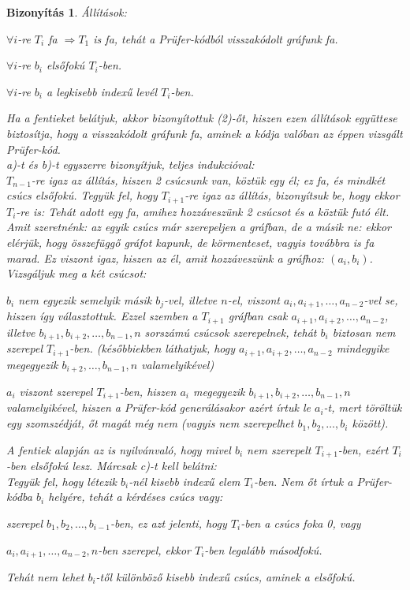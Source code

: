 \documentclass[a4paper,12pt,twoside]{book}
\newtheorem{biz}{Bizonyítás}[chapter]
\theoremstyle{break}
\begin{document}
\begin{biz}
\textit{Állítások}:
\begin{enumerate*}
 \renewcommand{\labelenumi}{\alph{enumi})}
 \item $\forall i$-re $T_i$ fa $\Rightarrow T_1$  is fa, tehát a Prüfer-kódból visszakódolt gráfunk fa.
 \item $\forall i$-re $b_i$ elsőfokú $T_i$-ben.
 \item $\forall i$-re $b_i$ a legkisebb indexű levél $T_i$-ben.
\end{enumerate*}
Ha a fentieket belátjuk, akkor bizonyítottuk (2)-őt, hiszen ezen állítások együttese biztosítja, hogy a visszakódolt gráfunk fa, aminek a kódja valóban az éppen vizsgált Prüfer-kód.\\
a)-t és b)-t egyszerre bizonyítjuk, teljes indukcióval:\\
$T_{n-1}$-re igaz az állítás, hiszen 2 csúcsunk van, köztük egy él; ez fa, és mindkét csúcs elsőfokú. Tegyük fel, hogy $T_{i+1}$-re igaz az állítás, bizonyítsuk be, hogy ekkor $T_i$-re is: Tehát adott egy fa, amihez hozzáveszünk 2 csúcsot és a köztük futó élt. Amit szeretnénk: az egyik csúcs már szerepeljen a gráfban, de a másik ne: ekkor elérjük, hogy összefüggő gráfot kapunk, de körmenteset, vagyis továbbra is fa marad. Ez viszont igaz, hiszen az él, amit hozzáveszünk a gráfhoz: $(a_i, b_i)$. Vizsgáljuk meg a két csúcsot:
\begin{itemize*}
 \item $b_i$ nem egyezik semelyik másik $b_j$-vel, illetve $n$-el, viszont $a_i, a_{i+1}, \ldots, a_{n-2}$-vel se, hiszen így választottuk. Ezzel szemben a $T_{i+1}$ gráfban csak $a_{i+1}, a_{i+2}, \ldots, a_{n-2}$, illetve $b_{i+1}, b_{i+2}, \ldots, b_{n-1}, n$ sorszámú csúcsok szerepelnek, tehát $b_i$ biztosan nem szerepel $T_{i+1}$-ben. (későbbiekben láthatjuk, hogy $a_{i+1}, a_{i+2}, \ldots, a_{n-2}$ mindegyike megegyezik $b_{i+2}, \ldots, b_{n-1}, n$ valamelyikével)
 \item $a_i$ viszont szerepel $T_{i+1}$-ben, hiszen $a_i$ megegyezik $b_{i+1}, b_{i+2}, \ldots, b_{n-1}, n$ valamelyikével, hiszen a Prüfer-kód generálásakor azért írtuk le $a_i$-t, mert töröltük egy szomszédját, őt magát még nem (vagyis nem szerepelhet $b_1, b_2, \ldots, b_i$ között).
\end{itemize*}
A fentiek alapján az is nyilvánvaló, hogy mivel $b_i$ nem szerepelt $T_{i+1}$-ben, ezért $T_i$-ben elsőfokú lesz. Márcsak c)-t kell belátni:\\
Tegyük fel, hogy létezik $b_i$-nél kisebb indexű elem $T_i$-ben. Nem őt írtuk a Prüfer-kódba $b_i$ helyére, tehát a kérdéses csúcs vagy:
\begin{itemize*}
 \item szerepel $b_1, b_2, \ldots, b_{i-1}$-ben, ez azt jelenti, hogy $T_i$-ben a csúcs foka 0, vagy
 \item $a_i, a_{i+1}, \ldots, a_{n-2}, n$-ben szerepel, ekkor $T_i$-ben legalább másodfokú.
\end{itemize*}
Tehát nem lehet $b_i$-től különböző kisebb indexű csúcs, aminek a elsőfokú.
\end{biz}
\end{document}
